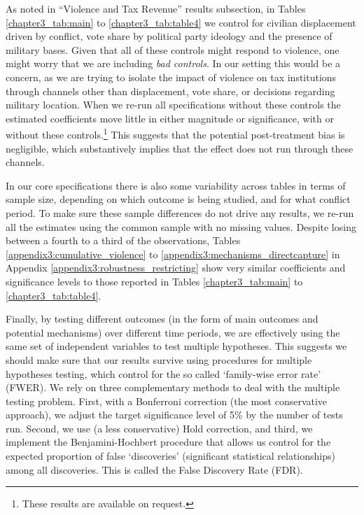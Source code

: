 As noted in ``Violence and Tax Revenue'' results subsection, in Tables \ref{chapter3_tab:main} to \ref{chapter3_tab:table4} we control for civilian displacement driven by conflict, vote share by political party ideology and the presence of military bases. Given that all of these controls might respond to violence, one might worry that we are including {\it bad controls}. In our setting this would be a concern, as we are trying to isolate the impact of violence on tax institutions through channels other than displacement, vote share, or decisions regarding military location. When we re-run all specifications without these controls the estimated coefficients move little in either magnitude or significance, with or without these controls.\footnote{These results are available on request.} This suggests that the potential post-treatment bias is negligible, which substantively implies that the effect does not run through these channels.

In our core specifications there is also some variability across tables in terms of sample size, depending on which outcome is being studied, and for what conflict period. To make sure these sample differences do not drive any results, we re-run all the estimates using the common sample with no missing values. Despite losing between a fourth to a third of the observations, Tables \ref{appendix3:cumulative_violence} to \ref{appendix3:mechanisms_directcapture} in Appendix \ref{appendix3:robustness_restricting} show very similar coefficients and significance levels to those reported in Tables \ref{chapter3_tab:main} to \ref{chapter3_tab:table4}. 
 
Finally, by testing different outcomes (in the form of main outcomes and potential mechanisms) over different time periods, we are effectively using the same set of independent variables to test multiple hypotheses. This suggests we should make sure that our results survive using procedures for multiple hypotheses testing, which control for the so called `family-wise error rate' (FWER). We rely on three complementary methods to deal with the multiple testing problem. First, with a Bonferroni correction (the most conservative approach), we adjust the target significance level of 5\% by the number of tests run. Second, we use (a less conservative) Hold correction, and third, we implement the Benjamini-Hochbert procedure that allows us control for the expected proportion of false `discoveries' (significant statistical relationships) among all discoveries. This is called the False Discovery Rate (FDR). 

